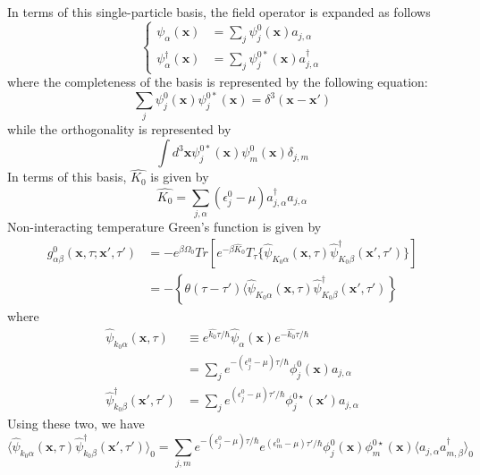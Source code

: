 In terms of this single-particle basis, the field operator is expanded as follows
\begin{equation}
\left\{
\begin{aligned}
\psi_\alpha(\mathbf{x})&=\sum_j\psi_j^0(\mathbf{x})a_{j,\alpha}\\
\psi_\alpha^\dagger(\mathbf{x})&=\sum_j\psi_j^{0*}(\mathbf{x})a^\dagger_{j,\alpha}
\end{aligned}
\right.
\end{equation}
where the completeness of the basis is represented by the following equation:
\begin{equation}\label{eq4.5.16}
\sum_j\psi_j^0(\mathbf{x})\psi_j^{0*}(\mathbf{x})=\delta^3(\mathbf{x}-\mathbf{x}')
\end{equation}
while the orthogonality is represented by
\begin{equation}
\int d^3\mathbf{x} \psi_j^{0*}(\mathbf{x})\psi_m^0(\mathbf{x}) \delta_{j,m}
\end{equation}
In terms of this basis, $\hat{K_0}$ is given by
\begin{equation}
\hat{K_0}=\sum_{j,\alpha}(\epsilon_j^0-\mu)a_{j,\alpha}^\dagger a_{j,\alpha}
\end{equation}
Non-interacting temperature Green's function is given by
\[
\begin{aligned}
g_{\alpha\beta}^0(\mathbf{x},\tau;\mathbf{x}',\tau')&=-e^{\beta\Omega_0}Tr\left[e^{-\beta\hat{K}_0} T_\tau\{\hat{\psi}_{K_0\alpha}(\mathbf{x},\tau) \hat{\psi}_{K_0\beta}^\dagger(\mathbf{x}',\tau')\}\right]\\
&=-\left\{\theta(\tau-\tau')\langle\hat{\psi}_{K_0\alpha}(\mathbf{x},\tau)\hat{\psi}_{K_0\beta}^\dagger(\mathbf{x}',\tau')\right\}
\end{aligned}
\]
where 
\[
\begin{aligned}
\hat{\psi}_{k_0\alpha}(\mathbf{x},\tau) & \equiv e^{\hat{k_0}\tau/\hbar} \hat{\psi}_\alpha(\mathbf{x}) e^{-\hat{k_0}\tau/\hbar}\\
&=\sum_j e^{-(\epsilon^0_j-\mu)\tau/\hbar} \phi^0_j(\mathbf{x}) a_{j,\alpha}\\
\hat{\psi}_{k_0\beta}^\dag(\mathbf{x}',\tau')&=\sum_j e^{(\epsilon^0_j-\mu)\tau'/\hbar} \phi^{0\star}_j(\mathbf{x}') a_{j,\alpha}
\end{aligned}
\]
Using these two, we have
\[
\langle \hat{\psi}_{k_0\alpha}(\mathbf{x},\tau) \hat{\psi}_{k_0\beta}^\dag(\mathbf{x}',\tau')\rangle_0
=\sum_{j,m}e^{-(\epsilon^0_j-\mu)\tau/\hbar} e^{(\epsilon^0_m-\mu)\tau'/\hbar} \phi_j^0(\mathbf{x})\phi_m^{0\star}(\mathbf{x}) \langle a_{j,\alpha}a^\dag_{m,\beta}\rangle_0
\]

